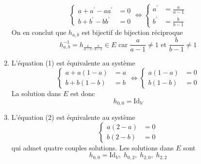 \begin{enumerate}
\begin{displaymath}
\left\lbrace 
\begin{aligned}
a+a^\prime -aa^\prime &=0 \\ b+b^\prime -bb^\prime &= 0  
\end{aligned}
\right. 
\Leftrightarrow
\left\lbrace 
\begin{aligned}
a^\prime &= \frac{a}{a-1} \\ b^\prime &= \frac{b}{b-1}  
\end{aligned}
\right. 
\end{displaymath}
On en conclut que $h_{a,b}$ est bijectif de bijection réciproque
\begin{displaymath}
h_{a,b}^{-1}=h_{\frac{a}{a-1},\frac{b}{b-1}}\in E 
\text{ car } \frac{a}{a-1}\neq 1 \text{ et } \frac{b}{b-1}\neq1 
\end{displaymath}

\item L'équation (1) est équivalente au système
\begin{displaymath}
\left\lbrace  
\begin{aligned}
a+a(1-a) &=  a \\ 
b+b(1-b) &=  b
\end{aligned}\right. \Leftrightarrow
\left\lbrace \begin{aligned}
a(1-a) &=  0 \\ 
b(1-b) &=  0
\end{aligned}\right.
\end{displaymath}
La solution dans $E$ est donc
\[h_{0,0}=\mathrm{Id}_V\]
\item L'équation (2) est équivalente au système
\begin{displaymath}
\left\lbrace  \begin{aligned}
a(2-a) &=  0 \\ 
b(2-b) &=  0
\end{aligned}\right.
\end{displaymath}
qui admet quatre couples solutions. Les solutions dans $E$ sont
\[h_{0,0}=\mathrm{Id}_V ,\;h_{0,2} ,\;h_{2,0} ,\;h_{2,2} \]
\end{enumerate}


